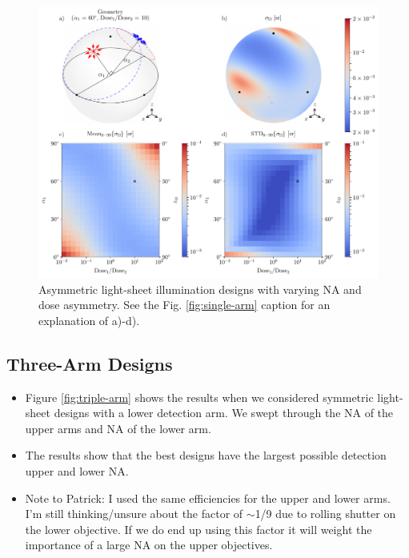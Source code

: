 \documentclass[10pt]{article}
\begin{document}
\begin{figure}[htbp]
\centering\includegraphics[width=\textwidth]{asymmetric-double}
\caption{Asymmetric light-sheet illumination designs with varying NA and
    dose asymmetry. See the Fig. \ref{fig:single-arm} caption for an explanation of a)-d).}
\label{fig:asymmetric-double}
\end{figure}

\subsection{Three-Arm Designs}
\begin{itemize}
\item Figure \ref{fig:triple-arm} shows the results when we considered
  symmetric light-sheet designs with a lower detection arm. We swept
  through the NA of the upper arms and NA of the lower arm.
\item The results show that the best designs have the largest possible detection
  upper and lower NA.
\item Note to Patrick: I used the same efficiencies for the upper and lower
  arms. I'm still thinking/unsure about the factor of $\sim$1/9 due to rolling
  shutter on the lower objective. If we do end up using this factor it will
  weight the importance of a large NA on the upper objectives.
\end{itemize}
\end{document}
